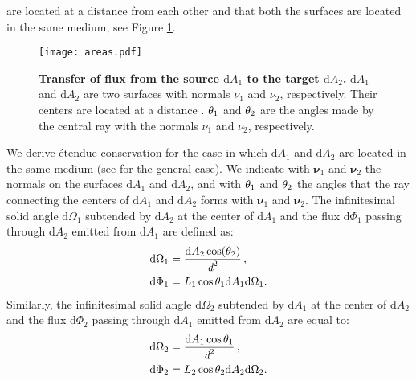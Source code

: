 are located at a distance  from each other and that both the surfaces are located in the same medium, see Figure \ref{fig:etendue_conservation}.
\begin{figure}[t]
 \label{fig:etendue_conservation}
     \begin{center}
     \texttt{[image: areas.pdf]}
     \end{center}
     \caption{\textbf{Transfer of flux from the source $\textrm{d}A_1$ to the target $\textrm{d}A_2$.} $\textrm{d}A_1$ and $\textrm{d}A_2$ are two surfaces with normals $\nu_1$ and $\nu_2$, respectively. Their centers are located at a distance .
$\theta_1$ and $\theta_2$ are the angles made by the central ray with the normals $\nu_1$ and $\nu_2$, respectively.}
\label{fig:etendue_conservation}
 \end{figure}
We derive \'{e}tendue conservation for the case in which $\textrm{d}A_1$ and $\textrm{d}A_2$ are located in the same medium (see \cite{chaves2015introduction, koshel2012illumination} for the general case).
We indicate with $\boldsymbol{\nu}_1$ and $\boldsymbol{\nu}_2$ the normals on the surfaces $\textrm{d}A_1$ and $\textrm{d}A_2$, and with $\theta_1$ and $\theta_2$ the angles that the ray connecting the centers of $\textrm{d}A_1$ and $\textrm{d}A_2$ forms with $\boldsymbol{\nu}_1$ and $\boldsymbol{\nu}_2$. The infinitesimal solid angle $\textrm{d}\Omega_1$ subtended by $\textrm{d}A_2$ at the center of $\textrm{d}A_1$ and the flux $\textrm{d}\Phi_1$ passing through $\textrm{d}A_2$ emitted from $\textrm{d}A_1$ are defined as:
\begin{subequations}
\begin{align}
\label{eq:omega1}
\textrm{d}\Omega_1 &= \frac{\textrm{d}A_2\cos(\theta_2)}{\textit{d}^2}\,,\\
\textrm{d}\Phi_1 &= L_1 \cos\theta_1 \textrm{d}A_1 \textrm{d}\Omega_1. \label{eq:phi1}
\end{align}
\end{subequations}
Similarly, the infinitesimal solid angle $\textrm{d}\Omega_2$ subtended by $\textrm{d}A_1$ at the center of $\textrm{d}A_2$ and the flux $\textrm{d}\Phi_2$ passing through $\textrm{d}A_1$ emitted from $\textrm{d}A_2$ are equal to:
\begin{subequations}\begin{align}\label{eq:omega2}
\textrm{d}\Omega_2 &= \frac{\textrm{d}A_1\cos\theta_1}{\textit{d}^2}\,,\\
\textrm{d}\Phi_2 &= L_2 \cos\theta_2 \textrm{d}A_2 \textrm{d}\Omega_2.\label{eq:phi2}
\end{align}
\end{subequations}
